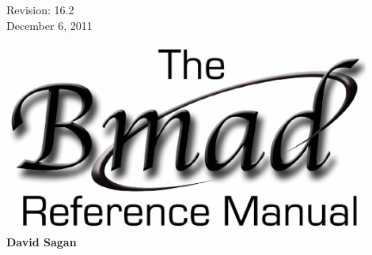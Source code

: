 \thispagestyle{empty}

\begin{flushright}
\large
  Revision: 16.2 \\
  December 6, 2011 \\
\end{flushright}

\vfill

{
\begin{center}
\includegraphics[width=12cm]{bmad-ref-manual.pdf} \\
\vskip 0.3in
\huge\bf David Sagan
\end{center}
}

\vfill
\break

